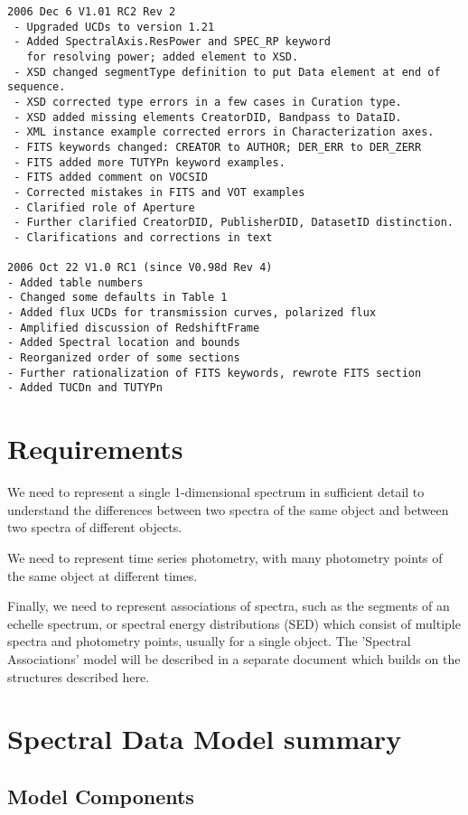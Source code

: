 \documentclass[11pt]{article}
\begin{document}
\begin{verbatim}
2006 Dec 6 V1.01 RC2 Rev 2
 - Upgraded UCDs to version 1.21
 - Added SpectralAxis.ResPower and SPEC_RP keyword
   for resolving power; added element to XSD.
 - XSD changed segmentType definition to put Data element at end of sequence.
 - XSD corrected type errors in a few cases in Curation type.
 - XSD added missing elements CreatorDID, Bandpass to DataID.
 - XML instance example corrected errors in Characterization axes. 
 - FITS keywords changed: CREATOR to AUTHOR; DER_ERR to DER_ZERR  
 - FITS added more TUTYPn keyword examples.
 - FITS added comment on VOCSID
 - Corrected mistakes in FITS and VOT examples
 - Clarified role of Aperture
 - Further clarified CreatorDID, PublisherDID, DatasetID distinction.
 - Clarifications and corrections in text

2006 Oct 22 V1.0 RC1 (since V0.98d Rev 4)
- Added table numbers
- Changed some defaults in Table 1
- Added flux UCDs for transmission curves, polarized flux
- Amplified discussion of RedshiftFrame
- Added Spectral location and bounds
- Reorganized order of some sections
- Further rationalization of FITS keywords, rewrote FITS section
- Added TUCDn and TUTYPn

\end{verbatim}

\clearpage

\section{Requirements}

We need to represent a single 1-dimensional spectrum in sufficient
detail to understand the differences between two spectra of the same
object and between two spectra of different objects.

We need to represent time series photometry, with many photometry points
of the same object at different times.

Finally, we need to represent associations of spectra,
such as the segments of an echelle spectrum, or
spectral energy distributions (SED) which
consist of multiple spectra and photometry points, usually for a single
object. The 'Spectral Associations' model will be described in
a separate document which builds on the structures described here.

\section{Spectral Data Model summary}

\subsection{Model Components}
\end{document}

